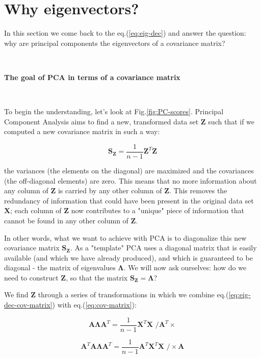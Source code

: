 \documentclass[10pt,twocolumn]{article}
\begin{document}
\section{Why eigenvectors?}

In this section we come back to the eq.(\ref{eq:eig-dec}) and answer the question: why are principal components the eigenvectors of a covariance matrix? 

\,\,
\,\,


\textbf{The goal of PCA in terms of a covariance matrix}

\,\,
\,\,

To begin the understanding, let's look at Fig.\ref{fig:PC-scores}. Principal Component Analysis aims to find a new, transformed data set $\bm{Z}$ such that if we computed a new covariance matrix in such a way:

\begin{equation}
\bm{S_Z} =  \frac{1}{n-1} \bm{Z}^T \bm{Z}
\end{equation}

the variances (the elements on the diagonal) are maximized and the covariances (the off-diagonal elements) are zero. This means that no more information about any column of $\bm{Z}$ is carried by any other column of $\bm{Z}$. This removes the redundancy of information that could have been present in the original data set $\bm{X}$; each column of $\bm{Z}$ now contributes to a "unique" piece of information that cannot be found in any other column of $\bm{Z}$.

In other words, what we want to achieve with PCA is to diagonalize this new covariance matrix $\bm{S_Z}$. As a "template" PCA uses a diagonal matrix that is easily available (and which we have already produced), and which is guaranteed to be diagonal - the matrix of eigenvalues $\bm{\Lambda}$. We will now ask ourselves: how do we need to construct $\bm{Z}$, so that the matrix $\bm{S_Z} = \bm{\Lambda}$?

We find $\bm{Z}$ through a series of transformations in which we combine eq.(\ref{eq:eig-dec-cov-matrix}) with eq.(\ref{eq:cov-matrix}):

\begin{equation}
\bm{A} \bm{\Lambda} \bm{A}^T =  \frac{1}{n-1} \bm{X}^T \bm{X} \,\, \Big/ \bm{A}^T \times
\end{equation}

\begin{equation}
\bm{A}^T \bm{A} \bm{\Lambda} \bm{A}^T =  \frac{1}{n-1} \bm{A}^T  \bm{X}^T \bm{X} \,\, \Big/ \times \bm{A}
\end{equation}
\end{document}
